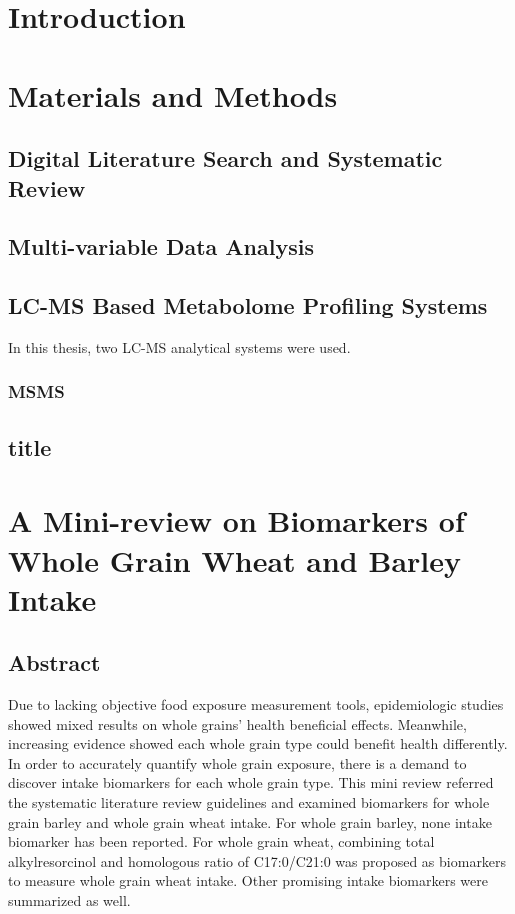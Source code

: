 \documentclass[]{report}
\begin{document}
%
\chapter{Introduction}


\chapter{Materials and Methods}

\section{Digital Literature Search and Systematic Review}

\section{Multi-variable Data Analysis}


\section{LC-MS Based Metabolome Profiling Systems}
In this thesis, two LC-MS analytical systems were used.

\subsection{MSMS}

\section{title}

\chapter{A Mini-review on Biomarkers of Whole Grain Wheat and Barley Intake}
	\section{Abstract}
	Due to lacking objective food exposure measurement tools, epidemiologic studies showed mixed results on whole grains' health beneficial effects.
	Meanwhile, increasing evidence showed each whole grain type could benefit health differently. 
	In order to accurately quantify whole grain exposure, there is a demand to discover intake biomarkers for each whole grain type.
	This mini review referred the systematic literature review guidelines and examined biomarkers for whole grain barley and whole grain wheat intake.
	For whole grain barley, none intake biomarker has been reported.
	For whole grain wheat, combining total alkylresorcinol and homologous ratio of C17:0/C21:0 was proposed as biomarkers to measure whole grain wheat intake.
	Other promising intake biomarkers were summarized as well.
\end{document}
